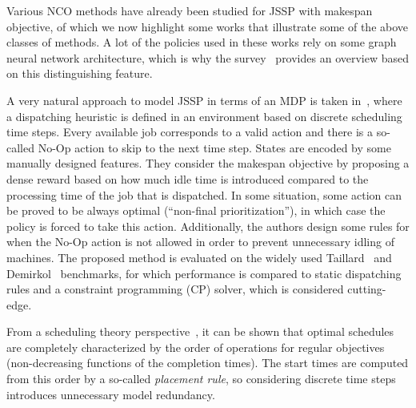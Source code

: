 \documentclass{article}
\theoremstyle{definition}
\theoremstyle{plain}
\begin{document}


Various NCO methods have already been studied for JSSP with makespan objective,
of which we now highlight some works that illustrate some of the above classes
of methods. A lot of the policies used in these works rely on some graph neural
network architecture, which is why the survey~\cite{smitGraphNeuralNetworks2024}
provides an overview based on this distinguishing feature.

A very natural approach to model JSSP in terms of an MDP is taken
in~\cite{tasselReinforcementLearningEnvironment2021}, where a dispatching
heuristic is defined in an environment based on discrete scheduling time steps.
%
Every available job corresponds to a valid action and there is a so-called No-Op
action to skip to the next time step. States are encoded by some manually
designed features. They consider the makespan objective by proposing a dense
reward based on how much idle time is introduced compared to the processing time
of the job that is dispatched.
%
In some situation, some action can be proved to be always optimal (``non-final
prioritization''), in which case the policy is forced to take this action.
Additionally, the authors design some rules for when the No-Op action is not
allowed in order to prevent unnecessary idling of machines.
%
The proposed method is evaluated on the widely used
Taillard~\cite{taillardBenchmarksBasicScheduling1993} and
Demirkol~\cite{DEMIRKOL1998137} benchmarks, for which performance is compared to
static dispatching rules and a constraint programming (CP) solver, which is
considered cutting-edge.

From a scheduling theory
perspective~\cite{pinedoSchedulingTheoryAlgorithms2016}, it can be shown that
optimal schedules are completely characterized by the order of operations for
regular objectives (non-decreasing functions of the completion times). The start
times are computed from this order by a so-called \textit{placement rule}, so
considering discrete time steps introduces unnecessary model redundancy.

\end{document}
